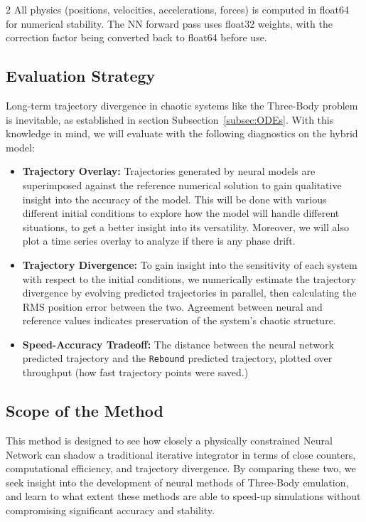 \documentclass{article}
\begin{document}
\begin{multicols}{2}
All physics (positions, velocities, accelerations, forces) is computed in float64 for numerical stability. The NN forward pass uses float32 weights, with the correction factor being converted back to float64 before use.

\subsection{Evaluation Strategy}
Long-term trajectory divergence in chaotic systems like the Three-Body problem is inevitable, as established in section Subsection~\ref{subsec:ODEs}. With this knowledge in mind, we will evaluate with the following diagnostics on the hybrid model: 

\begin{itemize}
    \item \textbf{Trajectory Overlay:} Trajectories generated by neural models are superimposed against the reference numerical solution to gain qualitative insight into the accuracy of the model. This will be done with various different initial conditions to explore how the model will handle different situations, to get a better insight into its versatility. Moreover, we will also plot a time series overlay to analyze if there is any phase drift.
    \item \textbf{Trajectory Divergence:} To gain insight into the sensitivity of each system with respect to the initial conditions, we numerically estimate the trajectory divergence by evolving predicted trajectories in parallel, then calculating the RMS position error between the two. Agreement between neural and reference values indicates preservation of the system’s chaotic structure.
    \item \textbf{Speed-Accuracy Tradeoff:} The distance between the neural network predicted trajectory and the \texttt{Rebound} predicted trajectory, plotted over throughput (how fast trajectory points were saved.)
\end{itemize}

\subsection{Scope of the Method}
This method is designed to see how closely a physically constrained Neural Network can shadow a traditional iterative integrator in terms of close counters, computational efficiency, and trajectory divergence. By comparing these two, we seek insight into the development of neural methods of Three-Body emulation, and learn to what extent these methods are able to speed-up simulations without compromising significant accuracy and stability. 


\end{multicols}
\end{document}

